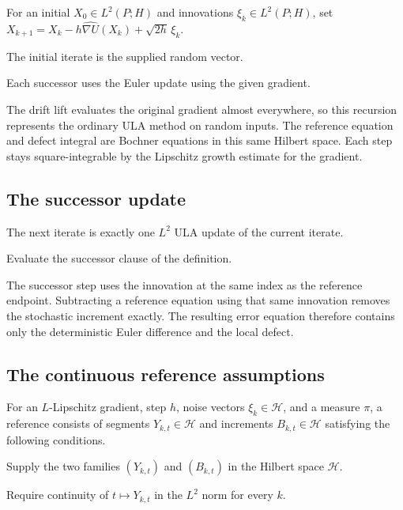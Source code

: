 \documentclass[11pt,a4paper]{article}
\begin{document}
For an initial \(X_0\in L^2(P;H)\) and innovations \(\xi_k\in L^2(P;H)\), set \(X_{k+1}=X_k-h\widehat{\nabla U}(X_k)+\sqrt{2h}\,\xi_k\).



The initial iterate is the supplied random vector.



Each successor uses the Euler update using the given gradient.



The drift lift evaluates the original gradient almost everywhere, so this recursion represents the ordinary ULA method on random inputs. The reference equation and defect integral are Bochner equations in this same Hilbert space. Each step stays square-integrable by the Lipschitz growth estimate for the gradient.


\subsection{\texorpdfstring{The successor update}{The successor update}}


The next iterate is exactly one \(L^2\) ULA update of the current iterate.



Evaluate the successor clause of the definition.



The successor step uses the innovation at the same index as the reference endpoint. Subtracting a reference equation using that same innovation removes the stochastic increment exactly. The resulting error equation therefore contains only the deterministic Euler difference and the local defect.


\subsection{\texorpdfstring{The continuous reference assumptions}{The continuous reference assumptions}}


For an \(L\)-Lipschitz gradient, step \(h\), noise vectors \(\xi_k\in\mathcal H\), and a measure \(\pi\), a reference consists of segments \(Y_{k,t}\in\mathcal H\) and increments \(B_{k,t}\in\mathcal H\) satisfying the following conditions.



Supply the two families \((Y_{k,t})\) and \((B_{k,t})\) in the Hilbert space \(\mathcal H\).



Require continuity of \(t\mapsto Y_{k,t}\) in the \(L^2\) norm for every \(k\).
\end{document}
